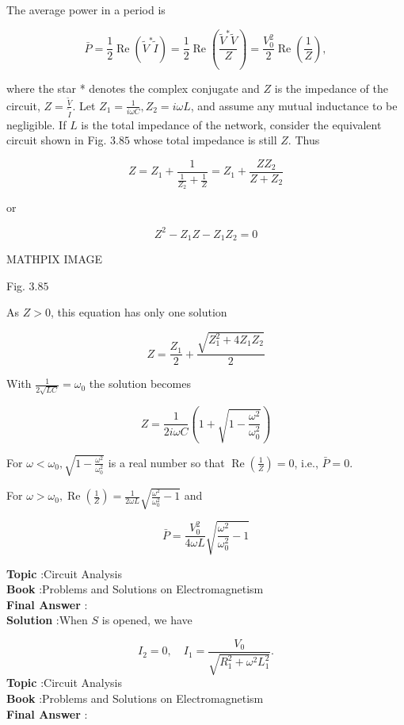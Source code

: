 \documentclass[10pt]{article}
\begin{document}
The average power in a period is

$$
\bar{P}=\frac{1}{2} \operatorname{Re}\left(\tilde{V}^{*} \tilde{I}\right)=\frac{1}{2} \operatorname{Re}\left(\frac{\tilde{V}^{*} \tilde{V}}{Z}\right)=\frac{V_{0}^{2}}{2} \operatorname{Re}\left(\frac{1}{Z}\right),
$$

where the star * denotes the complex conjugate and $Z$ is the impedance of the circuit, $Z=\frac{\tilde{V}}{\tilde{I}}$. Let $Z_{1}=\frac{1}{i \omega C}, Z_{2}=i \omega L$, and assume any mutual inductance to be negligible. If $L$ is the total impedance of the network, consider the equivalent circuit shown in Fig. $3.85$ whose total impedance is still $Z$. Thus

$$
Z=Z_{1}+\frac{1}{\frac{1}{Z_{2}}+\frac{1}{Z}}=Z_{1}+\frac{Z Z_{2}}{Z+Z_{2}}
$$

or

$$
Z^{2}-Z_{1} Z-Z_{1} Z_{2}=0
$$

MATHPIX IMAGE

Fig. $3.85$

As $Z>0$, this equation has only one solution

$$
Z=\frac{Z_{1}}{2}+\frac{\sqrt{Z_{1}^{2}+4 Z_{1} Z_{2}}}{2}
$$

With $\frac{1}{2 \sqrt{L C}}=\omega_{0}$ the solution becomes

$$
Z=\frac{1}{2 i \omega C}\left(1+\sqrt{1-\frac{\omega^{2}}{\omega_{0}^{2}}}\right)
$$

For $\omega<\omega_{0}, \sqrt{1-\frac{\omega^{2}}{\omega_{0}^{2}}}$ is a real number so that $\operatorname{Re}\left(\frac{1}{Z}\right)=0$, i.e., $\bar{P}=0$.

For $\omega>\omega_{0}, \operatorname{Re}\left(\frac{1}{Z}\right)=\frac{1}{2 \omega L} \sqrt{\frac{\omega^{2}}{\omega_{0}^{2}}-1}$ and

$$
\bar{P}=\frac{V_{0}^{2}}{4 \omega L} \sqrt{\frac{\omega^{2}}{\omega_{0}^{2}}-1}
$$



\textbf{Topic} :Circuit Analysis\\
\textbf{Book} :Problems and Solutions on Electromagnetism\\
\textbf{Final Answer} : \\


\textbf{Solution} :When $S$ is opened, we have

$$
I_{2}=0, \quad I_{1}=\frac{V_{0}}{\sqrt{R_{1}^{2}+\omega^{2} L_{1}^{2}}} .
$$
\textbf{Topic} :Circuit Analysis\\
\textbf{Book} :Problems and Solutions on Electromagnetism\\
\textbf{Final Answer} :\\
\end{document}
